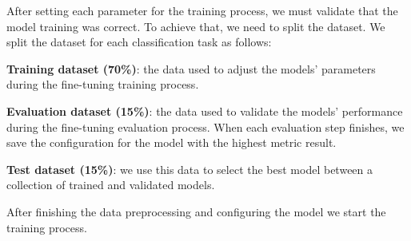 \noindent After setting each parameter for the training process, we must validate that the model training was correct. To achieve that, we need to split the dataset. We split the dataset for each classification task as follows: 

\begin{description}
\item{\textbf{Training dataset (70\%)}}: the data used to adjust the models' parameters during the fine-tuning training process.
\item{\textbf{Evaluation dataset (15\%)}}: the data used to validate the models' performance during the fine-tuning evaluation process. When each evaluation step finishes, we save the configuration for the model with the highest metric result. 
\item{\textbf{Test dataset (15\%)}}: we use this data to select the best model between a collection of trained and validated models.

\end{description}

After finishing the data preprocessing and configuring the model we start the training process. 


%
%
%
%
%
%
%
%
%

